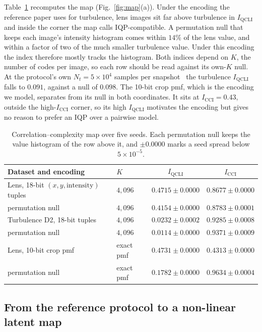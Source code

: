 \documentclass{article}
\newcommand{\qcli}{I_{\mathrm{QCLI}}}
\newcommand{\cci}{I_{\mathrm{CCI}}}
\begin{document}
Table~\ref{tab:map} recomputes the map (Fig.~\ref{fig:map}(a)). Under the encoding the reference
paper uses for turbulence, lens images sit far above turbulence in $\qcli$ and inside the corner
the map calls IQP-compatible. A permutation null that keeps each image's intensity histogram comes
within $14\%$ of the lens value, and within a factor of two of the much smaller turbulence value.
Under this encoding the index therefore mostly tracks the histogram. Both indices depend on $K$, the
number of codes per image, so each row should be read against its own-$K$ null. At the protocol's
own $N_t = 5\times10^{4}$ samples per snapshot~\cite{liu_2026_correlation} the turbulence $\qcli$
falls to $0.091$, against a null of $0.098$. The 10-bit crop pmf, which is the encoding we model,
separates from its null in both coordinates. It sits at $\cci = 0.43$, outside the high-$\cci$
corner, so its high $\qcli$ motivates the encoding but gives no reason to prefer an IQP over a
pairwise model.

\begin{table}[b]
\centering
\caption{Correlation--complexity map over five seeds. Each permutation null keeps the value
histogram of the row above it, and $\pm 0.0000$ marks a seed spread below $5\times10^{-5}$.}
\label{tab:map}
\scriptsize
\begin{tabular}{llcc}
\toprule
Dataset and encoding & $K$ & $\qcli$ & $\cci$ \\
\midrule
Lens, 18-bit $(x, y, \mathrm{intensity})$ tuples & $4{,}096$ & $0.4715 \pm 0.0000$ & $0.8677 \pm 0.0000$ \\
\quad permutation null            & $4{,}096$ & $0.4154 \pm 0.0000$ & $0.8783 \pm 0.0001$ \\
Turbulence D2, 18-bit tuples       & $4{,}096$ & $0.0232 \pm 0.0002$ & $0.9285 \pm 0.0008$ \\
\quad permutation null            & $4{,}096$ & $0.0114 \pm 0.0000$ & $0.9371 \pm 0.0009$ \\
\midrule
Lens, 10-bit crop pmf              & exact pmf & $0.4731 \pm 0.0000$ & $0.4313 \pm 0.0000$ \\
\quad permutation null            & exact pmf & $0.1782 \pm 0.0000$ & $0.9634 \pm 0.0004$ \\
\bottomrule
\end{tabular}
\end{table}

\subsection{From the reference protocol to a non-linear latent map}
\label{sec:latent}
\end{document}
